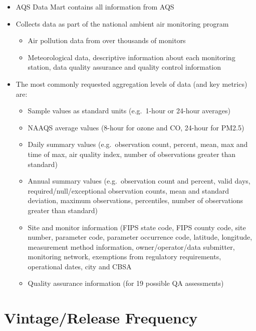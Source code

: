 \documentclass[
]{book}
\providecommand{\tightlist}{%
  \setlength{\itemsep}{0pt}\setlength{\parskip}{0pt}}
\begin{document}
\begin{itemize}
\tightlist
\item
  AQS Data Mart contains all information from AQS
\item
  Collects data as part of the national ambient air monitoring program

  \begin{itemize}
  \tightlist
  \item
    Air pollution data from over thousands of monitors
  \item
    Meteorological data, descriptive information about each monitoring station, data quality assurance and quality control information
  \end{itemize}
\item
  The most commonly requested aggregation levels of data (and key metrics) are:

  \begin{itemize}
  \tightlist
  \item
    Sample values as standard units (e.g.~1-hour or 24-hour averages)
  \item
    NAAQS average values (8-hour for ozone and CO, 24-hour for PM2.5)
  \item
    Daily summary values (e.g.~observation count, percent, mean, max and time of max, air quality index, number of observations greater than standard)
  \item
    Annual summary values (e.g.~observation count and percent, valid days, required/null/exceptional observation counts, mean and standard deviation, maximum observations, percentiles, number of observations greater than standard)
  \item
    Site and monitor information (FIPS state code, FIPS county code, site number, parameter code, parameter occurrence code, latitude, longitude, measurement method information, owner/operator/data submitter, monitoring network, exemptions from regulatory requirements, operational dates, city and CBSA
  \item
    Quality assurance information (for 19 possible QA assessments)
  \end{itemize}
\end{itemize}

\hypertarget{vintagerelease-frequency}{%
\section{Vintage/Release Frequency}\label{vintagerelease-frequency}}
\end{document}
